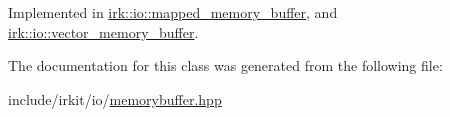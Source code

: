 Implemented in \mbox{\hyperlink{classirk_1_1io_1_1mapped__memory__buffer_ae64bb8d5018d83bd9feb605704bb0c82}{irk\+::io\+::mapped\+\_\+memory\+\_\+buffer}}, and \mbox{\hyperlink{classirk_1_1io_1_1vector__memory__buffer_ab79eda0d916da980b78ecae09883bba1}{irk\+::io\+::vector\+\_\+memory\+\_\+buffer}}.



The documentation for this class was generated from the following file\+:\begin{DoxyCompactItemize}
\item 
include/irkit/io/\mbox{\hyperlink{memorybuffer_8hpp}{memorybuffer.\+hpp}}\end{DoxyCompactItemize}
